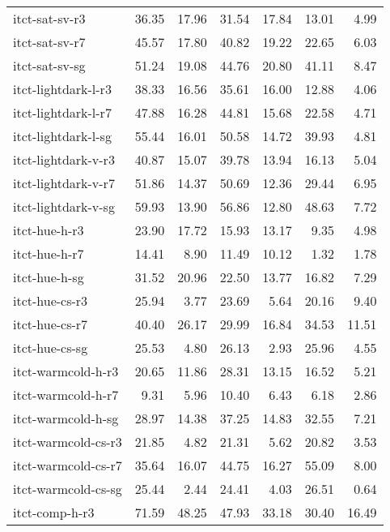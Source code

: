 \begin{tabular}{lrrrrrr}
itct-sat-sv-r3      &   36.35 &   17.96 &   31.54 &   17.84 &   13.01 &    4.99 \\
itct-sat-sv-r7      &   45.57 &   17.80 &   40.82 &   19.22 &   22.65 &    6.03 \\
itct-sat-sv-sg      &   51.24 &   19.08 &   44.76 &   20.80 &   41.11 &    8.47 \\
itct-lightdark-l-r3 &   38.33 &   16.56 &   35.61 &   16.00 &   12.88 &    4.06 \\
itct-lightdark-l-r7 &   47.88 &   16.28 &   44.81 &   15.68 &   22.58 &    4.71 \\
itct-lightdark-l-sg &   55.44 &   16.01 &   50.58 &   14.72 &   39.93 &    4.81 \\
itct-lightdark-v-r3 &   40.87 &   15.07 &   39.78 &   13.94 &   16.13 &    5.04 \\
itct-lightdark-v-r7 &   51.86 &   14.37 &   50.69 &   12.36 &   29.44 &    6.95 \\
itct-lightdark-v-sg &   59.93 &   13.90 &   56.86 &   12.80 &   48.63 &    7.72 \\
itct-hue-h-r3       &   23.90 &   17.72 &   15.93 &   13.17 &    9.35 &    4.98 \\
itct-hue-h-r7       &   14.41 &    8.90 &   11.49 &   10.12 &    1.32 &    1.78 \\
itct-hue-h-sg       &   31.52 &   20.96 &   22.50 &   13.77 &   16.82 &    7.29 \\
itct-hue-cs-r3      &   25.94 &    3.77 &   23.69 &    5.64 &   20.16 &    9.40 \\
itct-hue-cs-r7      &   40.40 &   26.17 &   29.99 &   16.84 &   34.53 &   11.51 \\
itct-hue-cs-sg      &   25.53 &    4.80 &   26.13 &    2.93 &   25.96 &    4.55 \\
itct-warmcold-h-r3  &   20.65 &   11.86 &   28.31 &   13.15 &   16.52 &    5.21 \\
itct-warmcold-h-r7  &    9.31 &    5.96 &   10.40 &    6.43 &    6.18 &    2.86 \\
itct-warmcold-h-sg  &   28.97 &   14.38 &   37.25 &   14.83 &   32.55 &    7.21 \\
itct-warmcold-cs-r3 &   21.85 &    4.82 &   21.31 &    5.62 &   20.82 &    3.53 \\
itct-warmcold-cs-r7 &   35.64 &   16.07 &   44.75 &   16.27 &   55.09 &    8.00 \\
itct-warmcold-cs-sg &   25.44 &    2.44 &   24.41 &    4.03 &   26.51 &    0.64 \\
itct-comp-h-r3      &   71.59 &   48.25 &   47.93 &   33.18 &   30.40 &   16.49 \\

\end{tabular}
